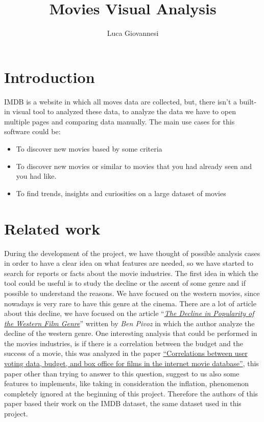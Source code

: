 \documentclass[]{article}
\title{Movies Visual Analysis}
\author{Luca Giovannesi}
\date{}
\newcommand{\quotes}[1]{``#1''}
\begin{document}
\maketitle

\section{Introduction}
IMDB is a website in which all moves data are collected, but, there isn't a built-in visual tool to analyzed these data, to analyze the data we have to open multiple pages and comparing data manually.\newline
The main use cases for this software could be:
\begin{itemize}
	\item To discover new movies based by some criteria
	\item To discover new movies or similar to movies that you had already seen and you had like.
	\item To find trends, insights and curiosities on a large dataset of movies
\end{itemize}
\section{Related work}
During the development of the project, we have thought of possible analysis cases in order to have a clear idea on what features are needed, so we have started to search for reports or facts about the movie industries.\newline
The first idea in which the tool could be useful is to study the decline or the ascent of some genre and if possible to understand the reasons. We have focused on the western movies, since nowadays is very rare to have this genre at the cinema. There are a lot of article about this decline, we have focused on the article \quotes{\emph{\href{https://screenculturejournal.com/2017/04/the-decline-in-popularity-of-the-western-film-genre/}{The Decline in Popularity of the Western Film Genre}}} written by \emph{Ben Pivoz} in which the author analyze the decline of the western genre.\newline\newline
One interesting analysis that could be performed in the movies industries, is if there is a correlation between the budget and the success of a movie, this was analyzed in the paper \href{https://asistdl.onlinelibrary.wiley.com/doi/full/10.1002/asi.23213}{\quotes{Correlations between user voting data, budget, and box office for films in the internet movie database}}, this paper other than trying to answer to this question, suggest to us also some features to implements, like taking in consideration the inflation, phenomenon completely ignored at the beginning of this project. Therefore the authors of this paper based their work on the IMDB dataset, the same dataset used in this project.
\end{document}
